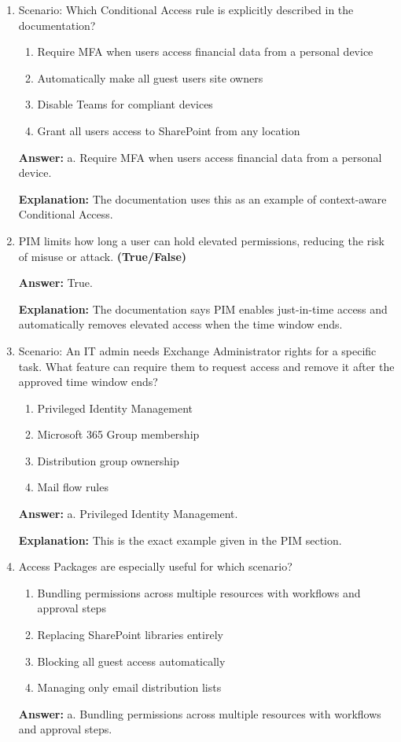 \documentclass[10pt]{article}
\begin{document}
\begin{enumerate}[leftmargin=*]
\item Scenario: Which Conditional Access rule is explicitly described in the documentation?
\begin{enumerate}[label=\alph*., leftmargin=1.5em]
\item Require MFA when users access financial data from a personal device
\item Automatically make all guest users site owners
\item Disable Teams for compliant devices
\item Grant all users access to SharePoint from any location
\end{enumerate}
\textbf{Answer:} a. Require MFA when users access financial data from a personal device.

\textbf{Explanation:} The documentation uses this as an example of context-aware Conditional Access.

\item PIM limits how long a user can hold elevated permissions, reducing the risk of misuse or attack. \textbf{(True/False)}

\textbf{Answer:} True.

\textbf{Explanation:} The documentation says PIM enables just-in-time access and automatically removes elevated access when the time window ends.

\item Scenario: An IT admin needs Exchange Administrator rights for a specific task. What feature can require them to request access and remove it after the approved time window ends?
\begin{enumerate}[label=\alph*., leftmargin=1.5em]
\item Privileged Identity Management
\item Microsoft 365 Group membership
\item Distribution group ownership
\item Mail flow rules
\end{enumerate}
\textbf{Answer:} a. Privileged Identity Management.

\textbf{Explanation:} This is the exact example given in the PIM section.

\item Access Packages are especially useful for which scenario?
\begin{enumerate}[label=\alph*., leftmargin=1.5em]
\item Bundling permissions across multiple resources with workflows and approval steps
\item Replacing SharePoint libraries entirely
\item Blocking all guest access automatically
\item Managing only email distribution lists
\end{enumerate}
\textbf{Answer:} a. Bundling permissions across multiple resources with workflows and approval steps.


\end{enumerate}
\end{document}
